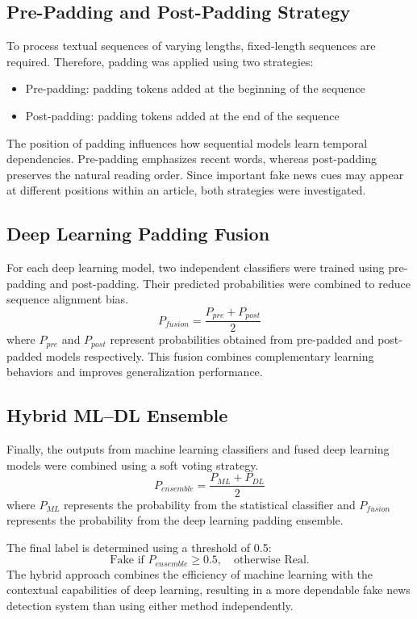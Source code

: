 \documentclass[conference]{IEEEtran}
\begin{document}
\subsection{Pre-Padding and Post-Padding Strategy}
To process textual sequences of varying lengths, fixed-length sequences are required. Therefore, padding was applied using two strategies:
\begin{itemize}
    \item Pre-padding: padding tokens added at the beginning of the sequence
    \item Post-padding: padding tokens added at the end of the sequence
\end{itemize}
The position of padding influences how sequential models learn temporal dependencies. Pre-padding emphasizes recent words, whereas post-padding preserves the natural reading order. Since important fake news cues may appear at different positions within an article, both strategies were investigated.

\subsection{Deep Learning Padding Fusion}
For each deep learning model, two independent classifiers were trained using pre-padding and post-padding. Their predicted probabilities were combined to reduce sequence alignment bias.
\[
P_{fusion} = \frac{P_{pre} + P_{post}}{2}
\]
where $P_{pre}$ and $P_{post}$ represent probabilities obtained from pre-padded and post-padded models respectively.
This fusion combines complementary learning behaviors and improves generalization performance.

\subsection{Hybrid ML–DL Ensemble}
Finally, the outputs from machine learning classifiers and fused deep learning models were combined using a soft voting strategy.
\[
P_{ensemble} = \frac{P_{ML} + P_{DL}}{2}
\]
where $P_{ML}$ represents the probability from the statistical classifier and $P_{fusion}$ represents the probability from the deep learning padding ensemble.

The final label is determined using a threshold of 0.5:
\[
\text{Fake if } P_{ensemble} \geq 0.5, \quad \text{otherwise Real.}
\]
The hybrid approach combines the efficiency of machine learning with the contextual capabilities of deep learning, resulting in a more dependable fake news detection system than using either method independently.
\end{document}
